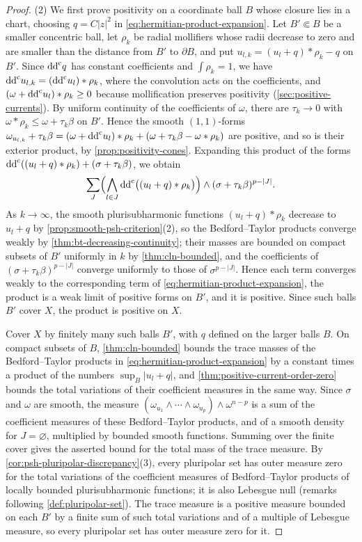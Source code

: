 \begin{proof}
(2) We first prove positivity on a coordinate ball $B$ whose closure lies in a chart, choosing $q=C|z|^2$ in \eqref{eq:hermitian-product-expansion}. Let $B'\Subset B$ be a smaller concentric ball, let $\rho_k$ be radial mollifiers whose radii decrease to zero and are smaller than the distance from $B'$ to $\partial B$, and put $u_{l,k}=(u_l+q)*\rho_k-q$ on $B'$. Since $\mathrm{dd}^{\mathrm{c}} q$ has constant coefficients and $\int\rho_k=1$, we have $\mathrm{dd}^{\mathrm{c}} u_{l,k}=(\mathrm{dd}^{\mathrm{c}} u_l)*\rho_k$, where the convolution acts on the coefficients, and $(\omega+\mathrm{dd}^{\mathrm{c}} u_l)*\rho_k\geq0$ because mollification preserves positivity (\cref{sec:positive-currents}). By uniform continuity of the coefficients of $\omega$, there are $\tau_k\to0$ with $\omega*\rho_k\leq\omega+\tau_k\beta$ on $B'$. Hence the smooth $(1,1)$-forms $\omega_{u_{l,k}}+\tau_k\beta=(\omega+\mathrm{dd}^{\mathrm{c}} u_l)*\rho_k+(\omega+\tau_k\beta-\omega*\rho_k)$ are positive, and so is their exterior product, by \cref{prop:positivity-cones}. Expanding this product of the forms $\mathrm{dd}^{\mathrm{c}}((u_l+q)*\rho_k)+(\sigma+\tau_k\beta)$, we obtain
\[
 \sum_J\Bigl(\bigwedge_{l\in J}\mathrm{dd}^{\mathrm{c}}\bigl((u_l+q)*\rho_k\bigr)\Bigr)\wedge(\sigma+\tau_k\beta)^{p-|J|}.
\]
As $k\to\infty$, the smooth plurisubharmonic functions $(u_l+q)*\rho_k$ decrease to $u_l+q$ by \cref{prop:smooth-psh-criterion}(2), so the Bedford--Taylor products converge weakly by \cref{thm:bt-decreasing-continuity}; their masses are bounded on compact subsets of $B'$ uniformly in $k$ by \cref{thm:cln-bounded}, and the coefficients of $(\sigma+\tau_k\beta)^{p-|J|}$ converge uniformly to those of $\sigma^{p-|J|}$. Hence each term converges weakly to the corresponding term of \eqref{eq:hermitian-product-expansion}, the product is a weak limit of positive forms on $B'$, and it is positive. Since such balls $B'$ cover $X$, the product is positive on $X$.

Cover $X$ by finitely many such balls $B'$, with $q$ defined on the larger balls $B$. On compact subsets of $B$, \cref{thm:cln-bounded} bounds the trace masses of the Bedford--Taylor products in \eqref{eq:hermitian-product-expansion} by a constant times a product of the numbers $\sup_B|u_l+q|$, and \cref{thm:positive-current-order-zero} bounds the total variations of their coefficient measures in the same way. Since $\sigma$ and $\omega$ are smooth, the measure $(\omega_{u_1}\wedge\cdots\wedge\omega_{u_p})\wedge\omega^{n-p}$ is a sum of the coefficient measures of these Bedford--Taylor products, and of a smooth density for $J=\varnothing$, multiplied by bounded smooth functions. Summing over the finite cover gives the asserted bound for the total mass of the trace measure. By \cref{cor:psh-pluripolar-discrepancy}(3), every pluripolar set has outer measure zero for the total variations of the coefficient measures of Bedford--Taylor products of locally bounded plurisubharmonic functions; it is also Lebesgue null (remarks following \cref{def:pluripolar-set}). The trace measure is a positive measure bounded on each $B'$ by a finite sum of such total variations and of a multiple of Lebesgue measure, so every pluripolar set has outer measure zero for it.


\end{proof}
